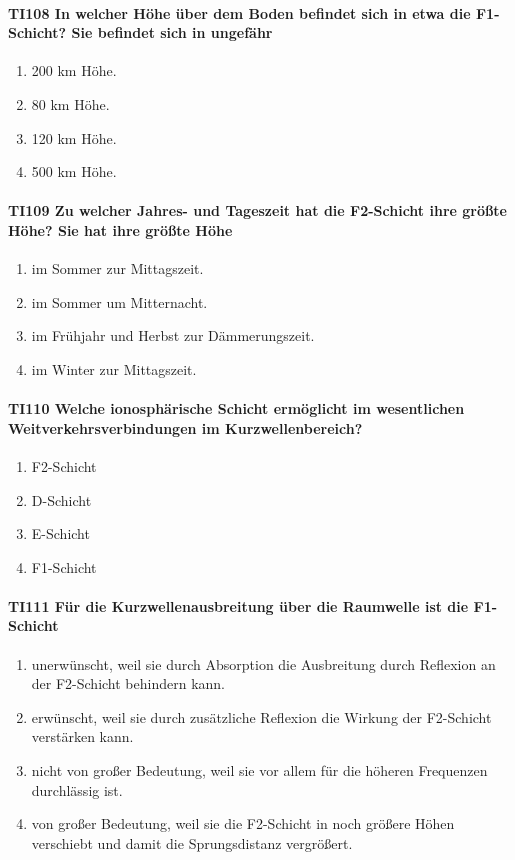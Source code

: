 \documentclass[8pt]{article}
\begin{document}
\paragraph*{TI108 In welcher Höhe über dem Boden befindet sich in etwa die F1-Schicht? Sie befindet sich in ungefähr}
\begin{enumerate}[nolistsep,label=\Alph*]
\item 200 km Höhe.
\item 80 km Höhe.
\item 120 km Höhe.
\item 500 km Höhe.
\end{enumerate}

\paragraph*{TI109 Zu welcher Jahres- und Tageszeit hat die F2-Schicht ihre größte Höhe? Sie hat ihre größte Höhe} 
\begin{enumerate}[nolistsep,label=\Alph*]
\item im Sommer zur Mittagszeit.
\item im Sommer um Mitternacht.
\item im Frühjahr und Herbst zur Dämmerungszeit.
\item im Winter zur Mittagszeit.
\end{enumerate}

\paragraph*{TI110 Welche ionosphärische Schicht ermöglicht im wesentlichen Weitverkehrsverbindungen im Kurzwellenbereich?}
\begin{enumerate}[nolistsep,label=\Alph*]
\item F2-Schicht
\item D-Schicht
\item E-Schicht
\item F1-Schicht
\end{enumerate}

\paragraph*{TI111 Für die Kurzwellenausbreitung über die Raumwelle ist die F1-Schicht} 
\begin{enumerate}[nolistsep,label=\Alph*]
\item unerwünscht, weil sie durch Absorption die Ausbreitung durch Reflexion an der F2-Schicht behindern kann.
\item erwünscht, weil sie durch zusätzliche Reflexion die Wirkung der F2-Schicht verstärken kann.
\item nicht von großer Bedeutung, weil sie vor allem für die höheren Frequenzen durchlässig ist.
\item von großer Bedeutung, weil sie die F2-Schicht in noch größere Höhen verschiebt und damit die Sprungsdistanz vergrößert.
\end{enumerate}
\end{document}
